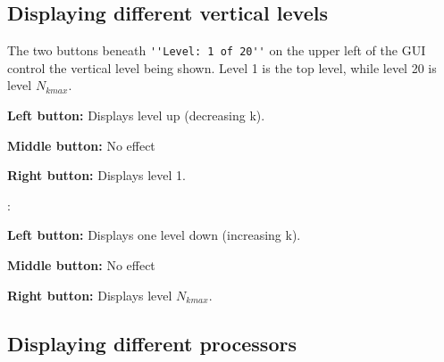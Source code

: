 \documentclass[12pt,oneside]{article}
\begin{document}
\subsection{Displaying different vertical levels}

The two buttons beneath \verb+''Level: 1 of 20''+ on the upper left of the GUI control the vertical level
being shown.  Level 1 is the top level, while level 20 is level $N_{kmax}$.
\begin{list}{}
\item \button{$<--$}
\begin{list}{}
\item {\bf Left button:} Displays level up (decreasing k).
\item {\bf Middle button:} No effect
\item {\bf Right button:} Displays level 1.
\end{list}
\item \button{$-->$}:
\begin{list}{}
\item {\bf Left button:} Displays one level down (increasing k).
\item {\bf Middle button:} No effect
\item {\bf Right button:} Displays level $N_{kmax}$.
\end{list}
\end{list}

\subsection{Displaying different processors}
\end{document}
